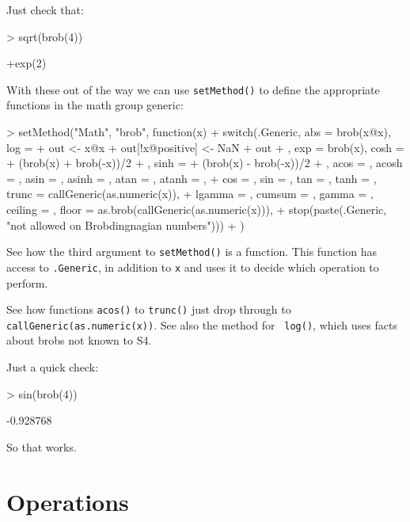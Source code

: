 \documentclass[a4paper]{article}
\begin{document}
Just check that:
\begin{Schunk}
\begin{Sinput}
> sqrt(brob(4))
\end{Sinput}
\begin{Soutput}
[1] +exp(2)
\end{Soutput}
\end{Schunk}


With these out of the way we can use {\tt setMethod()} to define the 
appropriate functions in the math group generic:

\begin{Schunk}
\begin{Sinput}
> setMethod("Math", "brob", function(x) {
+     switch(.Generic, abs = brob(x@x), log = {
+         out <- x@x
+         out[!x@positive] <- NaN
+         out
+     }, exp = brob(x), cosh = {
+         (brob(x) + brob(-x))/2
+     }, sinh = {
+         (brob(x) - brob(-x))/2
+     }, acos = , acosh = , asin = , asinh = , atan = , atanh = , 
+         cos = , sin = , tan = , tanh = , trunc = callGeneric(as.numeric(x)), 
+         lgamma = , cumsum = , gamma = , ceiling = , floor = as.brob(callGeneric(as.numeric(x))), 
+         stop(paste(.Generic, "not allowed on Brobdingnagian numbers")))
+ })
\end{Sinput}
\end{Schunk}

See how the third argument to {\tt setMethod()} is a function.  This
function has access to {\tt .Generic}, in addition to {\tt x} and uses
it to decide which operation to perform.

See how functions {\tt acos()} to {\tt trunc()} just drop through to
{\tt callGeneric(as.numeric(x))}.  See also the method for {\tt
log()}, which uses facts about brobs not known to S4.

Just a quick check:

\begin{Schunk}
\begin{Sinput}
> sin(brob(4))
\end{Sinput}
\begin{Soutput}
[1] -0.928768
\end{Soutput}
\end{Schunk}

So that works.

\section{Operations}
\end{document}

